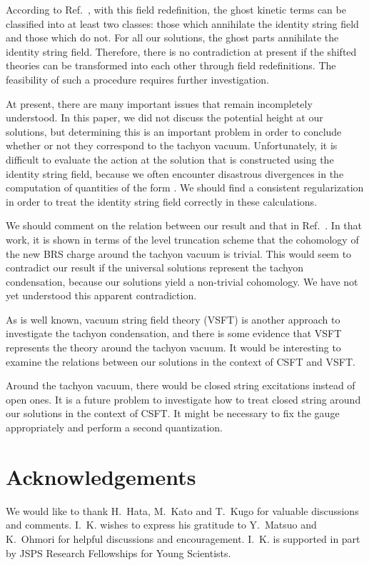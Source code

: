 \documentclass[a4paper,seceq,preprint]{ptptex}
\begin{document}
According to Ref.~, with this field redefinition, the ghost
kinetic terms \coordHE{} can be classified into at least two classes: those
which annihilate the identity string field and those which do not. For
all our solutions, the ghost parts annihilate the
identity string field.\cite{rf:TT,rf:Schnabl2}
Therefore, there is no contradiction at present if the shifted theories
can be transformed into each other through field redefinitions.
The feasibility of such a procedure requires further investigation.

At present, there are many important issues that remain incompletely
understood.
In this paper, we did not discuss the potential height at our solutions, but
determining this is an important problem in order to conclude whether or
not they correspond to the tachyon vacuum. 
Unfortunately, it is difficult to evaluate the action at the solution
that is constructed using the identity string field, because we often encounter
disastrous divergences in the computation of quantities of 
the form \coordHE{}.  We should find a consistent regularization in order to treat
the identity string field correctly in these calculations.  

We should comment on the relation between our result and that in
Ref.~. In that work, it is shown
in terms of the level truncation scheme
that the cohomology of the new BRS
charge around the tachyon vacuum is trivial.
This would seem to contradict our result if the universal
solutions represent the tachyon condensation, because our solutions
yield a non-trivial cohomology.
We have not yet understood this apparent contradiction.

As is well known, vacuum string field theory (VSFT)
\cite{rf:VSFT1,rf:VSFT2} is 
another approach to investigate the tachyon condensation, and there is
some evidence that VSFT represents the theory around the tachyon
vacuum. \cite{rf:Okawa} 
It would be interesting to examine the relations between our
solutions in the context of CSFT and VSFT. 

Around the tachyon vacuum, there would be closed string excitations
instead of open ones. 
It is a future problem to investigate how to treat closed string around
our solutions in the context of CSFT. It might be necessary to fix the
gauge appropriately and perform a second quantization. 



\section*{Acknowledgements}
We would like to thank H.~Hata, M.~Kato and T.~Kugo for valuable
discussions and comments. 
I.~K. wishes to express his gratitude to Y.~Matsuo and K.~Ohmori for helpful discussions and encouragement.
I.~K. is supported in part by JSPS Research Fellowships for Young Scientists.
\end{document}
